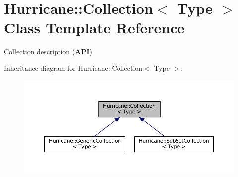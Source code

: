 \hypertarget{classHurricane_1_1Collection}{}\section{Hurricane\+:\+:Collection$<$ Type $>$ Class Template Reference}
\label{classHurricane_1_1Collection}


\mbox{\hyperlink{classHurricane_1_1Collection}{Collection}} description ({\bfseries A\+PI})  




Inheritance diagram for Hurricane\+:\+:Collection$<$ Type $>$\+:\nopagebreak
\begin{figure}[H]
\begin{center}
\leavevmode
\includegraphics[width=350pt]{classHurricane_1_1Collection__inherit__graph}
\end{center}
\end{figure}

